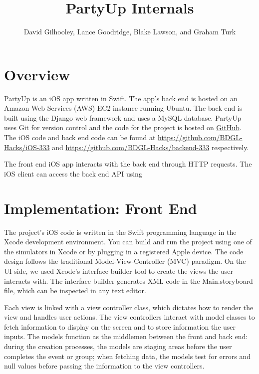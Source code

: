\documentclass[12pt]{article}
\title{PartyUp Internals}
\author{David Gilhooley, Lance Goodridge, Blake Lawson, and Graham Turk}
\begin{document}
\pagestyle{plain}

\maketitle


\section{Overview}

PartyUp is an iOS app written in Swift.
The app's back end is hosted on an Amazon Web Services (AWS)
EC2 instance running Ubuntu.
The back end is built using the Django web framework and uses
a MySQL database.
PartyUp uses Git for version control and the code for the project is 
hosted on \href{https://github.com/}{GitHub}.
The iOS code and back end code can be found at 
\url{https://github.com/BDGL-Hacks/iOS-333} and
\url{https://github.com/BDGL-Hacks/backend-333} respectively.

The front end iOS app interacts with the back end through HTTP requests.
The iOS client can access the back end API using 


\section{Implementation: Front End}

The project's iOS code is written in the Swift programming language in the Xcode development environment.
You can build and run the project using one of the simulators in Xcode or
by plugging in a registered Apple device.
The code design follows the traditional Model-View-Controller (MVC) paradigm.
On the UI side, we used Xcode's interface builder tool to
create the views the user interacts with.
The interface builder generates XML code in the Main.storyboard file,
which can be inspected in any text editor.

Each view is linked with a view controller class,
which dictates how to render the view and handles user actions.
The view controllers interact with model classes to fetch information
to display on the screen and to store information the user inputs.
The models function as the middlemen between the front and back end:
during the creation processes, the models are staging areas before the user completes the event or group;
when fetching data, the models test for errors and
null values before passing the information to the view controllers.
\end{document}

